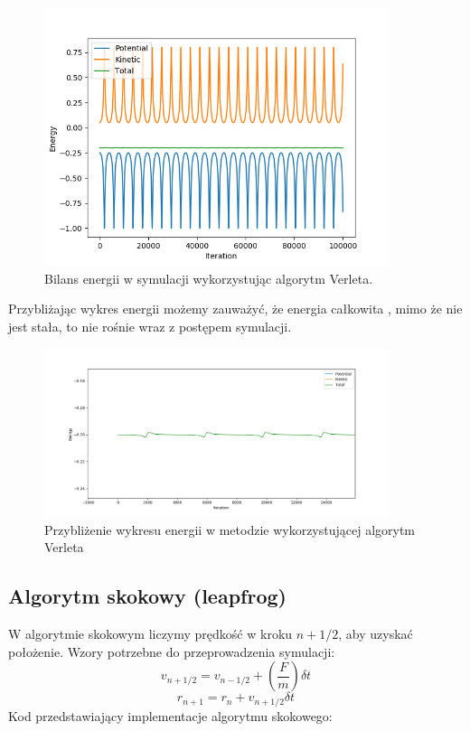 \documentclass[10pt,a4paper]{article}
\begin{document}
	\begin{figure}[htp!!!!!!!]	
		\begin{center}
			\includegraphics[width = 0.9\textwidth]{verlet_energy.png}
			\caption{Bilans energii w symulacji wykorzystując algorytm Verleta.}
			\label{schemat}
		\end{center}
	\end{figure} 

	Przybliżając wykres energii możemy zauważyć, że energia całkowita , mimo że nie jest 
	stała, to nie rośnie wraz z postępem symulacji. 
	
	\begin{figure}[htp!!!!!!!]	
		\begin{center}
			\includegraphics[width = 0.9\textwidth]{verlet_energy_closeup.png}
			\caption{Przybliżenie wykresu energii w metodzie wykorzystującej 
					 algorytm Verleta}
			\label{schemat}
		\end{center}
	\end{figure} 
	
\subsection*{Algorytm skokowy (leapfrog)}
	W algorytmie skokowym liczymy prędkość w kroku $n + 1/2$, aby uzyskać
	położenie. Wzory potrzebne do przeprowadzenia symulacji:
	$$ v_{n + 1/2} = v_{n - 1/2} + (\frac{F}{m})\delta t $$
	$$ r_{n + 1} = r_{n} + v_{n + 1/2} \delta t $$
	Kod przedstawiający implementacje algorytmu skokowego:
	
\end{document}
